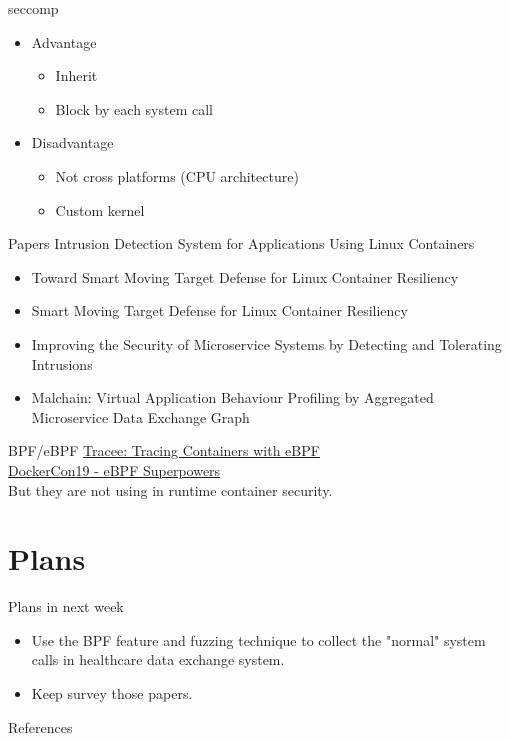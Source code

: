 \documentclass{beamer}
\begin{document}
\begin{CJK*}{UTF8}{bsmi}
  \begin{frame}{seccomp}
    \begin{itemize}
      \item Advantage
            \begin{itemize}
              \item Inherit
              \item Block by each system call
            \end{itemize}
      \item Disadvantage
            \begin{itemize}
              \item Not cross platforms (CPU architecture)
              \item Custom kernel
            \end{itemize}
    \end{itemize}
  \end{frame}

  \begin{frame}{Papers}
    Intrusion Detection System for Applications Using Linux Containers \cite*{10.1007/978-3-319-24858-5_8}
    \begin{itemize}
      \item Toward Smart Moving Target Defense for Linux Container Resiliency \cite{7796855}
      \item Smart Moving Target Defense for Linux Container Resiliency \cite*{7809699}
      \item Improving the Security of Microservice Systems by Detecting and Tolerating Intrusions \cite*{9307722}
      \item Malchain: Virtual Application Behaviour Profiling by Aggregated Microservice Data Exchange Graph \cite*{9407328}
    \end{itemize}
  \end{frame}

  \begin{frame}{BPF/eBPF}
    \href{https://blog.aquasec.com/ebpf-tracing-containers}{Tracee: Tracing Containers with eBPF}\\
    \href{https://www.youtube.com/watch?v=4SiWL5tULnQ}{DockerCon19 - eBPF Superpowers}\\

    But they are not using in {\color{red} runtime} container security.
  \end{frame}

  \section{Plans}
  \begin{frame}{Plans in next week}
    \begin{itemize}
      \item Use the BPF feature and fuzzing technique to collect the "normal" system calls in healthcare data exchange system.
      \item Keep survey those papers.
    \end{itemize}
  \end{frame}

  \begin{frame}{References}
    \def\bibfont{\footnotesize}
    \printbibliography
  \end{frame}

\end{CJK*}
\end{document}
